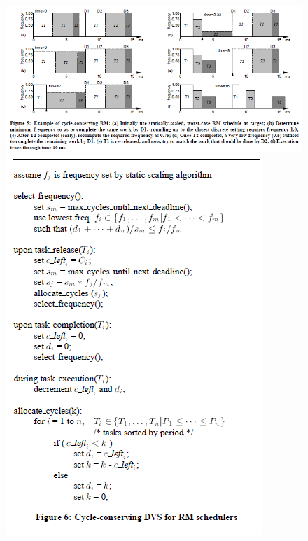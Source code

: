 \documentclass[11pt
  , a4paper
  , article
  , oneside
]{memoir}
\begin{document}
\begin{figure}[h!]
	\centering
	\includegraphics{./images/fig05.png}
	\includegraphics{./images/fig06.png}
\end{figure}
\end{document}
